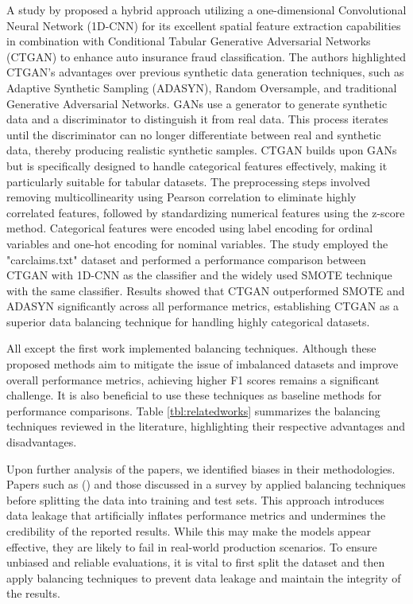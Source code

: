 \documentclass[twoside,11pt]{article}
\begin{document}
A study by \cite{Wongpanti2024} proposed a hybrid approach utilizing a one-dimensional Convolutional Neural Network (1D-CNN) for its excellent spatial feature extraction capabilities in combination with Conditional Tabular Generative Adversarial Networks (CTGAN) to enhance auto insurance fraud classification. The authors highlighted CTGAN’s advantages over previous synthetic data generation techniques, such as Adaptive Synthetic Sampling (ADASYN), Random Oversample, and traditional Generative Adversarial Networks. GANs use a generator to generate synthetic data and a discriminator to distinguish it from real data. This process iterates until the discriminator can no longer differentiate between real and synthetic data, thereby producing realistic synthetic samples. CTGAN builds upon GANs but is specifically designed to handle categorical features effectively, making it particularly suitable for tabular datasets. The preprocessing steps involved removing multicollinearity using Pearson correlation to eliminate highly correlated features, followed by standardizing numerical features using the z-score method. Categorical features were encoded using label encoding for ordinal variables and one-hot encoding for nominal variables. The study employed the "carclaims.txt" dataset and performed a performance comparison between CTGAN with 1D-CNN as the classifier and the widely used SMOTE technique with the same classifier. Results showed that CTGAN outperformed SMOTE and ADASYN significantly across all performance metrics, establishing CTGAN as a superior data balancing technique for handling highly categorical datasets.

All except the first work implemented balancing techniques. Although these proposed methods aim to mitigate the issue of imbalanced datasets and improve overall performance metrics, achieving higher F1 scores remains a significant challenge. It is also beneficial to use these techniques as baseline methods for performance comparisons. Table \ref{tbl:relatedworks} summarizes the balancing techniques reviewed in the literature, highlighting their respective advantages and disadvantages.

Upon further analysis of the papers, we identified biases in their methodologies. Papers such as (\citealp{Harjai2019, Padhi2020}) and those discussed in a survey by \cite{schrijverAutomobileInsuranceFraud2024} applied balancing techniques before splitting the data into training and test sets. This approach introduces data leakage that artificially inflates performance metrics and undermines the credibility of the reported results. While this may make the models appear effective, they are likely to fail in real-world production scenarios. To ensure unbiased and reliable evaluations, it is vital to first split the dataset and then apply balancing techniques to prevent data leakage and maintain the integrity of the results. 
\end{document}
